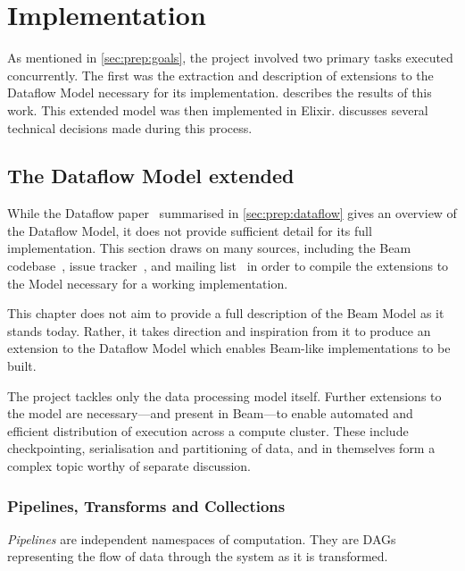 \chapter{Implementation}\label{ch:impl}

As mentioned in \cref{sec:prep:goals}, the project involved two primary tasks executed concurrently.
The first was the extraction and description of extensions to the Dataflow Model necessary for its implementation.
 describes the results of this work.
This extended model was then implemented in Elixir.
 discusses several technical decisions made during this process.

\section{The Dataflow Model extended}\label{sec:impl:dataflow}

While the Dataflow paper~\cite{Akidau:2015} summarised in \cref{sec:prep:dataflow} gives an overview of the Dataflow Model, it does not provide sufficient detail for its full implementation.
This section draws on many sources, including the Beam codebase~\cite{Beam-code}, issue tracker~\cite{Beam-JIRA}, and mailing list~\cite{Beam-mailing} in order to compile the extensions to the Model necessary for a working implementation.

This chapter does not aim to provide a full description of the Beam Model as it stands today.
Rather, it takes direction and inspiration from it to produce an extension to the Dataflow Model which enables Beam-like implementations to be built.

The project tackles only the data processing model itself.
Further extensions to the model are necessary---and present in Beam---to enable automated and efficient distribution of execution across a compute cluster.
These include checkpointing, serialisation and partitioning of data, and in themselves form a complex topic worthy of separate discussion.

\subsection{Pipelines, Transforms and Collections}\label{sec:impl:dataflow:pipelines-transforms-collections}

\emph{Pipelines} are independent namespaces of computation.
They are DAGs representing the flow of data through the system as it is transformed.

